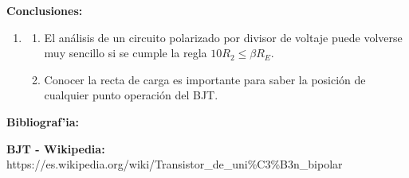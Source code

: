 \documentclass[11pt, letterpaper]{report}
\newenvironment{enumTab}{\begin{enumerate}[label=]\item \begin{enumerate}[label=$\bullet$]}{\end{enumerate}\end{enumerate}} %
\newenvironment{block}[1]{\hspace{-0.8 cm}\textbf{\Large #1}}{\vspace{3 mm}} %
\newcommand{\bib}[2]{ \textbf{\large #1:} \small #2\\} %
\begin{document}
	\vspace{3 mm}
	\begin{block}{Conclusiones:}
	\begin{enumTab}
		\item El an\'alisis de un circuito polarizado por divisor de voltaje puede volverse muy sencillo si se cumple la regla $10R_2 \leq\beta R_E$.
		\item Conocer la recta de carga es importante para saber la posici\'on de cualquier punto operaci\'on del BJT.
	\end{enumTab}
	\end{block}
		
		
	\begin{block}{Bibliograf'ia:}
	
		\bib{BJT - Wikipedia}{https://es.wikipedia.org/wiki/Transistor\_de\_uni\%C3\%B3n\_bipolar}
	\end{block}
		
\end{document}
